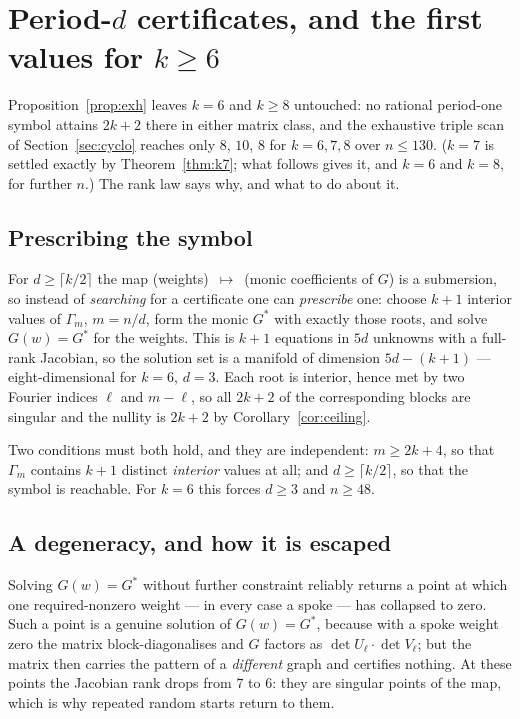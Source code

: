 \documentclass[11pt]{article}
\theoremstyle{definition}
\begin{document}
\section{Period-$d$ certificates, and the first values for $k\ge6$}
\label{sec:periodd}
Proposition~\ref{prop:exh} leaves $k=6$ and $k\ge8$ untouched: no rational
period-one symbol attains $2k+2$ there in either matrix class, and the
exhaustive triple scan of Section~\ref{sec:cyclo} reaches only $8$, $10$, $8$
for $k=6,7,8$ over $n\le130$. ($k=7$ is settled exactly by
Theorem~\ref{thm:k7}; what follows gives it, and $k=6$ and $k=8$, for further
$n$.) The rank law says why, and what to do about it.

\subsection*{Prescribing the symbol}
For $d\ge\lceil k/2\rceil$ the map (weights)~$\mapsto$~(monic coefficients of
$G$) is a submersion, so instead of \emph{searching} for a certificate one can
\emph{prescribe} one: choose $k+1$ interior values of $\Gamma_m$, $m=n/d$, form
the monic $G^\ast$ with exactly those roots, and solve $G(w)=G^\ast$ for the
weights. This is $k+1$ equations in $5d$ unknowns with a full-rank Jacobian,
so the solution set is a manifold of dimension $5d-(k+1)$ --- eight-dimensional
for $k=6$, $d=3$. Each root is interior, hence met by two Fourier indices
$\ell$ and $m-\ell$, so all $2k+2$ of the corresponding blocks are singular and
the nullity is $2k+2$ by Corollary~\ref{cor:ceiling}.

Two conditions must both hold, and they are independent:
$m\ge2k+4$, so that $\Gamma_m$ contains $k+1$ distinct \emph{interior} values
at all; and $d\ge\lceil k/2\rceil$, so that the symbol is reachable. For $k=6$
this forces $d\ge3$ and $n\ge48$.

\subsection*{A degeneracy, and how it is escaped}
Solving $G(w)=G^\ast$ without further constraint reliably returns a point at
which one required-nonzero weight --- in every case a spoke --- has collapsed to
zero. Such a point is a genuine solution of $G(w)=G^\ast$, because with a spoke
weight zero the matrix block-diagonalises and $G$ factors as
$\det U_\ell\cdot\det V_\ell$; but the matrix then carries the pattern of a
\emph{different} graph and certifies nothing. At these points the Jacobian rank
drops from $7$ to $6$: they are singular points of the map, which is why
repeated random starts return to them.
\end{document}
